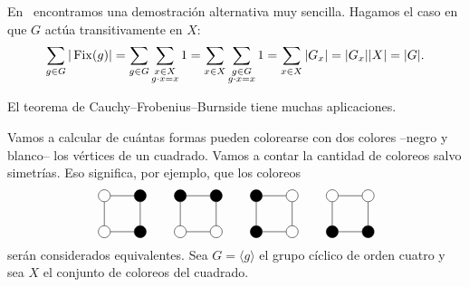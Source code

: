 En~\cite{MR1997347} encontramos una 
demostración alternativa muy sencilla. Hagamos el caso en que $G$ actúa transitivamente en $X$: 
\[
\sum_{g\in G}|\operatorname{Fix}(g)|=\sum_{g\in G}\sum_{\substack{x\in X\\g\cdot x=x}}1=\sum_{x\in X}\sum_{\substack{g\in G\\g\cdot x=x}}1=\sum_{x\in X}|G_x|=|G_x||X|=|G|.
\]

El teorema de Cauchy--Frobenius--Burnside tiene muchas aplicaciones.

\begin{example}
Vamos a calcular de cuántas formas pueden colorearse con dos colores --negro y blanco--
los vértices de un cuadrado. Vamos a contar la cantidad de coloreos salvo simetrías. 
Eso significa, por ejemplo, 
que los coloreos 
\begin{equation}
\label{eq:orbita}
\begin{tikzpicture}
    \node[shape=circle,draw=black,fill=black] (A) at (1,0){};
    \node[shape=circle,draw=black,fill=black] (B) at (1,1){};
    \node[shape=circle,draw=black] (C) at (0,1){}; 
    \node[shape=circle,draw=black] (D) at (0,0){};
    \path [-](A) edge node[left]{} (B);
    \path [-](B) edge node[left]{} (C);
    \path [-](C) edge node[left]{} (D);
    \path [-](D) edge node[left]{} (A);
\end{tikzpicture}
\qquad
\begin{tikzpicture}
    \node[shape=circle,draw=black] (A) at (1,0) {};
    \node[shape=circle,draw=black,fill=black] (B) at (1,1) {};
    \node[shape=circle,draw=black,fill=black] (C) at (0,1) {};
    \node[shape=circle,draw=black] (D) at (0,0) {};
    \path [-](A) edge node[left]{} (B);
    \path [-](B) edge node[left]{} (C);
    \path [-](C) edge node[left]{} (D);
    \path [-](D) edge node[left]{} (A);
\end{tikzpicture}
\qquad
\begin{tikzpicture}
    \node[shape=circle,draw=black] (A) at (1,0) {};
    \node[shape=circle,draw=black] (B) at (1,1) {};
    \node[shape=circle,draw=black,fill=black] (C) at (0,1) {};
    \node[shape=circle,draw=black,fill=black] (D) at (0,0) {};
    \path [-](A) edge node[left]{} (B);
    \path [-](B) edge node[left]{} (C);
    \path [-](C) edge node[left]{} (D);
    \path [-](D) edge node[left]{} (A);
\end{tikzpicture}
\qquad
\begin{tikzpicture}
    \node[shape=circle,draw=black,fill=black] (A) at (1,0) {};
    \node[shape=circle,draw=black] (B) at (1,1) {};
    \node[shape=circle,draw=black] (C) at (0,1) {};
    \node[shape=circle,draw=black,fill=black] (D) at (0,0) {};
    \path [-](A) edge node[left]{} (B);
    \path [-](B) edge node[left]{} (C);
    \path [-](C) edge node[left]{} (D);
    \path [-](D) edge node[left]{} (A);
\end{tikzpicture}
\end{equation}
serán considerados equivalentes. Sea $G=\langle g\rangle$ el grupo cíclico de orden cuatro y sea $X$ 
el conjunto de coloreos del cuadrado. 


\end{example}
